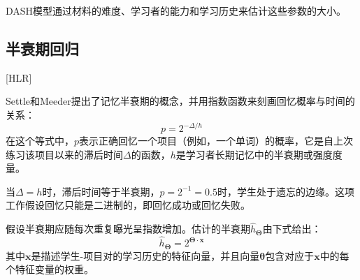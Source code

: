 DASH模型通过材料的难度、学习者的能力和学习历史来估计这些参数的大小\cite{jonesPredictingImprovingMemory2016}。






\subsection{半衰期回归}[HLR]

Settle和Meeder\cite{settlesTrainableSpacedRepetition2016}提出了记忆半衰期的概念，并用指数函数来刻画回忆概率与时间的关系：
\begin{equation}
p = 2^{-\Delta/h}
\end{equation}
在这个等式中，$p$表示正确回忆一个项目（例如，一个单词）的概率，它是自上次练习该项目以来的滞后时间$\Delta$的函数，$h$是学习者长期记忆中的半衰期或强度度量。

当$\Delta=h$时，滞后时间等于半衰期，$p=2^{-1}=0.5$时，学生处于遗忘的边缘。这项工作假设回忆只能是二进制的，即回忆成功或回忆失败。

假设半衰期应随每次重复曝光呈指数增加。估计的半衰期$\hat{h}_{\bm\Theta}$由下式给出：
\begin{equation}
\hat{h}_{\bm\Theta}=2^{\bm\Theta \cdot \bm x}
\end{equation}
其中$\bm x$是描述学生-项目对的学习历史的特征向量，并且向量$\bm \theta$包含对应于$\bm x$中的每个特征变量的权重。

